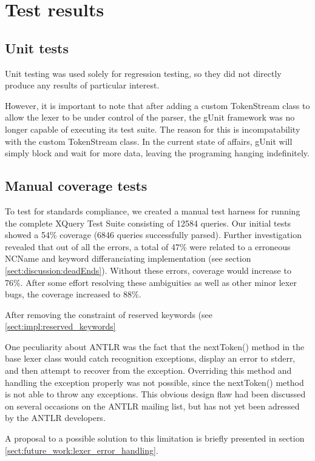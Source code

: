 \section{Test results}
\label{sect:results:tests}
\subsection{Unit tests}
Unit testing was used solely for regression testing, so they did not directly 
produce any results of particular interest.

However, it is important to note that after adding a custom TokenStream class to
allow the lexer to be under control of the parser, the gUnit framework was no
longer capable of executing its test suite. The reason for this is
incompatability with the custom TokenStream class. In the current state of
affairs, gUnit will simply block and wait for more data, leaving the programing
hanging indefinitely. 

\subsection{Manual coverage tests}
\label{sect:tests:manual}
To test for standards compliance, we created a manual test harness for running
the complete XQuery Test Suite\cite{w3c05} consisting of 12584 queries. Our
initial tests showed a 54\% coverage (6846 queries successfully parsed). Further
investigation revealed that out of all the errors, a total of 47\% were related
to a erroneous NCName and keyword differanciating implementation (see section \ref{sect:discussion:deadEnds}). Without these errors, coverage would increase to 76\%. After some effort resolving these ambiguities as well as other minor lexer
bugs, the coverage increased to 88\%.

After removing the constraint of reserved keywords (see
\ref{sect:impl:reserved_keywords}

One peculiarity about ANTLR was the fact that the nextToken() method in the base
lexer class would catch recognition exceptions, display an error to stderr, and
then attempt to recover from the exception. Overriding this method and handling
the exception properly was not possible, since the nextToken() method is not
able to throw any exceptions. This obvious design flaw had been discussed on
several occasions on the ANTLR mailing list\cite{antlrmail}, but has not yet
been adressed by the ANTLR developers.

A proposal to a possible solution to this limitation is briefly presented in
section \ref{sect:future_work:lexer_error_handling}.